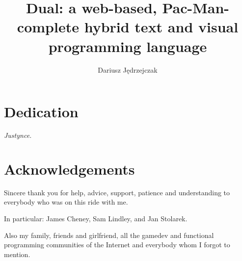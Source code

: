 \documentclass[a4paper,12pt,twoside]{book}
\author{Dariusz Jędrzejczak}
\title{Dual: a web-based, Pac-Man-complete hybrid text and visual programming language}
\begin{document}
\frontmatter


%

\chapter*{Dedication}
\textit{Justynce.}

\chapter*{Acknowledgements}
Sincere thank you for help, advice, support, patience and understanding to everybody who was on this ride with me.

In particular:
James Cheney, Sam Lindley, and Jan Stolarek.

Also my family, friends and girlfriend, all the gamedev and functional programming communities of the Internet and everybody whom I forgot to mention.

\tableofcontents

\mainmatter
\pagestyle{headings}
%
%
%
%
%
%


%

\printglossaries

\appendix
\renewcommand{\chaptermark}[1]{%
\markboth{\MakeUppercase{%
APPENDIX \thechapter.%
\ }}{}}
%

\listoffigures
\end{document}
